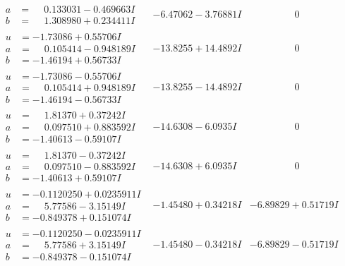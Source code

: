 \documentclass[1p]{elsarticle_modified}
\theoremstyle{definition}
\begin{document}
$$\begin{array}{c|c|c}
\begin{aligned}
a &= \phantom{-}0.133031 - 0.469663 I \\
b &= \phantom{-}1.308980 + 0.234411 I\end{aligned}
 & -6.47062 - 3.76881 I & \phantom{-0.000000 } 0 \\ \hline\begin{aligned}
u &= -1.73086 + 0.55706 I \\
a &= \phantom{-}0.105414 - 0.948189 I \\
b &= -1.46194 + 0.56733 I\end{aligned}
 & -13.8255 + 14.4892 I & \phantom{-0.000000 } 0 \\ \hline\begin{aligned}
u &= -1.73086 - 0.55706 I \\
a &= \phantom{-}0.105414 + 0.948189 I \\
b &= -1.46194 - 0.56733 I\end{aligned}
 & -13.8255 - 14.4892 I & \phantom{-0.000000 } 0 \\ \hline\begin{aligned}
u &= \phantom{-}1.81370 + 0.37242 I \\
a &= \phantom{-}0.097510 + 0.883592 I \\
b &= -1.40613 - 0.59107 I\end{aligned}
 & -14.6308 - 6.0935 I & \phantom{-0.000000 } 0 \\ \hline\begin{aligned}
u &= \phantom{-}1.81370 - 0.37242 I \\
a &= \phantom{-}0.097510 - 0.883592 I \\
b &= -1.40613 + 0.59107 I\end{aligned}
 & -14.6308 + 6.0935 I & \phantom{-0.000000 } 0 \\ \hline\begin{aligned}
u &= -0.1120250 + 0.0235911 I \\
a &= \phantom{-}5.77586 - 3.15149 I \\
b &= -0.849378 + 0.151074 I\end{aligned}
 & -1.45480 + 0.34218 I & -6.89829 + 0.51719 I \\ \hline\begin{aligned}
u &= -0.1120250 - 0.0235911 I \\
a &= \phantom{-}5.77586 + 3.15149 I \\
b &= -0.849378 - 0.151074 I\end{aligned}
 & -1.45480 - 0.34218 I & -6.89829 - 0.51719 I \\ \hline\begin{aligned}

\end{aligned}
\end{array}$$
\end{document}
